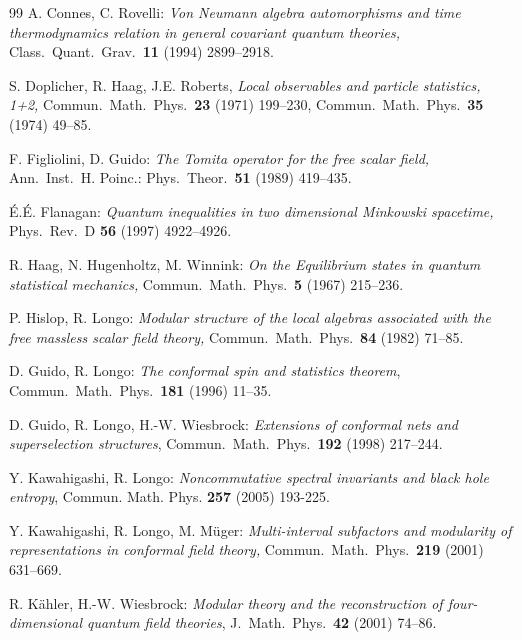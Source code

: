 \documentclass[12pt]{article}
\begin{document}
\begin{thebibliography}{99}
 A. Connes, C. Rovelli: 
 {\it Von Neumann algebra automorphisms and time thermodynamics relation in
 general covariant quantum theories,}
 Class.\ Quant.\ Grav.\ {\bf 11} (1994) 2899--2918.

  S. Doplicher, R. Haag, J.E. Roberts,
 {\it Local observables and particle statistics, 1+2,}
 Commun.\ Math.\ Phys.\ {\bf 23} (1971) 199--230, 
 Commun.\ Math.\ Phys.\ {\bf 35} (1974) 49--85. 

 F. Figliolini, D. Guido:
 {\it The Tomita operator for the free scalar field,}
 Ann.\ Inst.\ H. Poinc.: Phys.\ Theor.\  {\bf 51} (1989) 419--435.

 \'E.\'E. Flanagan: {\it Quantum inequalities in two
 dimensional Minkowski spacetime,} 
 Phys.\ Rev.\  D {\bf 56} (1997) 4922--4926.
 
 R. Haag, N. Hugenholtz, M. Winnink:
 {\it On the Equilibrium states in quantum statistical mechanics,}
 Commun.\ Math.\ Phys.\  {\bf 5} (1967) 215--236.

 P. Hislop, R. Longo:
 {\it Modular structure of the local algebras associated with the
 free massless scalar field theory,}
 Commun.\ Math.\ Phys.\  {\bf 84} (1982) 71--85.

 D. Guido, R. Longo:
 {\it The conformal spin and statistics theorem},
 Commun.\ Math.\ Phys.\ {\bf 181} (1996) 11--35.

 D. Guido, R. Longo, H.-W. Wiesbrock:
 {\it Extensions of conformal nets and superselection structures},
 Commun.\ Math.\ Phys.\ {\bf 192} (1998) 217--244.

 Y. Kawahigashi, R. Longo: 
 {\it Noncommutative spectral invariants and black hole entropy},
 Commun. Math. Phys. {\bf 257} (2005) 193-225.

 Y. Kawahigashi, R. Longo, M. M\"uger: 
 {\it Multi-interval subfactors and modularity of representations in
 conformal field theory,}
 Commun.\ Math.\ Phys.\ {\bf 219} (2001) 631--669.
 
 R. K\"ahler, H.-W. Wiesbrock: 
 {\it Modular theory and the reconstruction of four-dimensional
 quantum field theories}, 
 J.\ Math.\ Phys.\ {\bf 42} (2001) 74--86.


\end{thebibliography}
\end{document}
